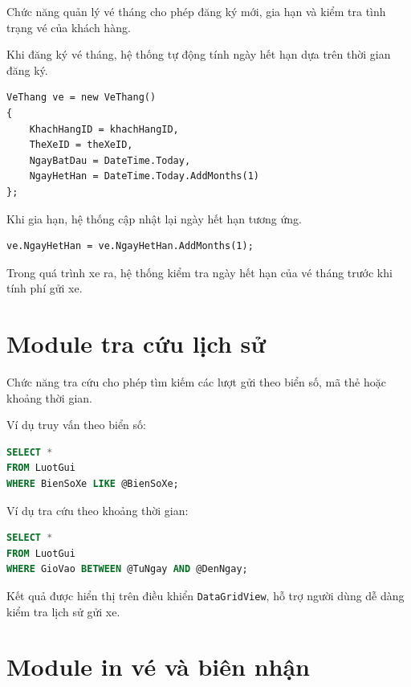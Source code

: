 Chức năng quản lý vé tháng cho phép đăng ký mới, gia hạn và kiểm
tra tình trạng vé của khách hàng.

Khi đăng ký vé tháng, hệ thống tự động tính ngày hết hạn dựa trên
thời gian đăng ký.

\begin{lstlisting}
VeThang ve = new VeThang()
{
    KhachHangID = khachHangID,
    TheXeID = theXeID,
    NgayBatDau = DateTime.Today,
    NgayHetHan = DateTime.Today.AddMonths(1)
};
\end{lstlisting}

Khi gia hạn, hệ thống cập nhật lại ngày hết hạn tương ứng.

\begin{lstlisting}
ve.NgayHetHan = ve.NgayHetHan.AddMonths(1);
\end{lstlisting}

Trong quá trình xe ra, hệ thống kiểm tra ngày hết hạn của vé tháng
trước khi tính phí gửi xe.

\section{Module tra cứu lịch sử}

Chức năng tra cứu cho phép tìm kiếm các lượt gửi theo biển số,
mã thẻ hoặc khoảng thời gian.

Ví dụ truy vấn theo biển số:

\begin{lstlisting}[language=SQL]
SELECT *
FROM LuotGui
WHERE BienSoXe LIKE @BienSoXe;
\end{lstlisting}

Ví dụ tra cứu theo khoảng thời gian:

\begin{lstlisting}[language=SQL]
SELECT *
FROM LuotGui
WHERE GioVao BETWEEN @TuNgay AND @DenNgay;
\end{lstlisting}

Kết quả được hiển thị trên điều khiển \texttt{DataGridView},
hỗ trợ người dùng dễ dàng kiểm tra lịch sử gửi xe.

\section{Module in vé và biên nhận}

